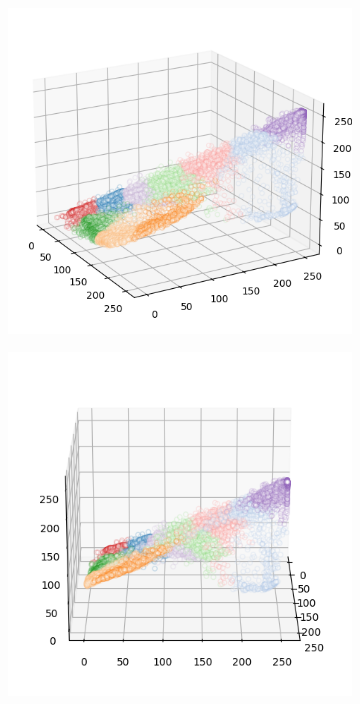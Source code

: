 \begin{figure}[htbp]
\begin{subfigure}[t]{0.32\textwidth}
    \end{subfigure}
    \begin{subfigure}[t]{0.32\textwidth}
        \includegraphics[width=\linewidth]{../../python_code/plots/kmeans/flower-6/clusters_elev20_azim-30.png}
    \end{subfigure}
    \begin{subfigure}[t]{0.32\textwidth}
        \includegraphics[width=\linewidth]{../../python_code/plots/kmeans/flower-6/clusters_elev20_azim0.png}

\end{subfigure}
\end{figure}
